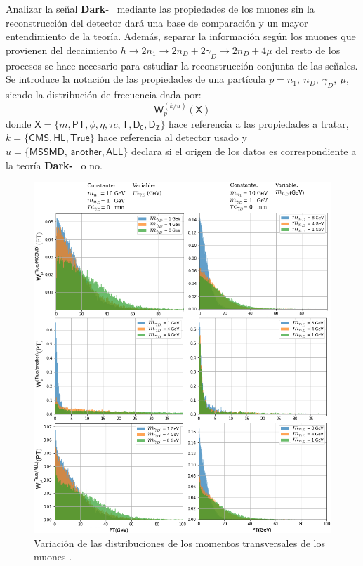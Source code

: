 Analizar la señal \textbf{Dark}-\SUSY ~ mediante las propiedades de los muones sin la reconstrucción del detector dará una base de comparación y un mayor entendimiento de la teoría. Además, separar la información según los muones que provienen del decaimiento $h \rightarrow 2n_1 \rightarrow 2n_D + 2\gamma_D \rightarrow 2n_D + 4\mu$ del resto de los procesos se hace necesario para estudiar la reconstrucción conjunta de las señales. Se introduce la notación de las propiedades de una partícula $p= n_1, ~n_D, ~\gamma_D, ~\mu$, siendo la distribución de frecuencia dada por:
\begin{equation}
\textsf{W}^{(k/u)}_{p} (\textsf{X})
\end{equation}
 donde $\textsf{X}=\{m, \textsf{PT},\phi, \eta, \tau c , \textsf{T}, \textsf{D}_\textsf{0}, \textsf{D}_\textsf{Z}\}$ hace referencia a las propiedades a tratar, $k=\{\textsf{CMS}, \textsf{HL}, \textsf{True}\}$ hace referencia al detector usado y $u=\{\textsf{MSSMD, another},\textsf{ALL}\}$ declara si el origen de los datos es correspondiente a la teoría \textbf{Dark-}\SUSY ~ o no. 

\begin{figure}[!ht]
\centering
\includegraphics[width=.9\textwidth]{Simulacion/imagenes/True_PT4.png}
\caption{Variación de las distribuciones de los momentos transversales de los muones .}
\label{PT_mu_True}
\end{figure}

